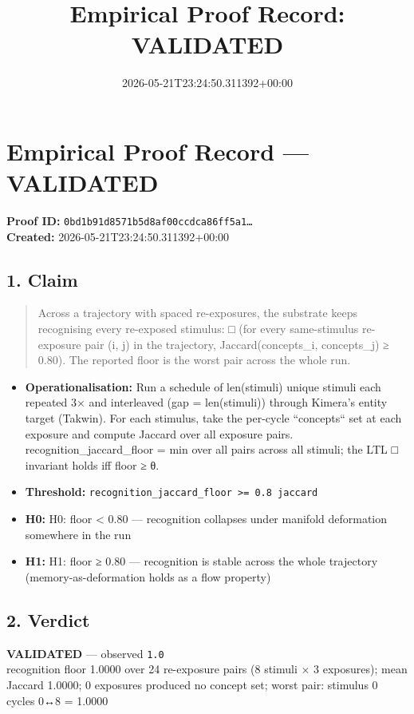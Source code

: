 \documentclass{article}
\title{Empirical Proof Record: VALIDATED}
\date{2026-05-21T23:24:50.311392+00:00}
\begin{document}
\maketitle
\section*{Empirical Proof Record --- \textcolor{validated}{\textbf{VALIDATED}}}
\textbf{Proof ID:} \texttt{0bd1b91d8571b5d8af00ccdca86ff5a1\dots}\\
\textbf{Created:} 2026-05-21T23:24:50.311392+00:00
\subsection*{1. Claim}
\begin{quote}Across a trajectory with spaced re-exposures, the substrate keeps recognising every re-exposed stimulus: □ (for every same-stimulus re-exposure pair (i, j) in the trajectory, Jaccard(concepts\_i, concepts\_j) ≥ 0.80). The reported floor is the worst pair across the whole run.\end{quote}
\begin{itemize}
\item \textbf{Operationalisation:} Run a schedule of len(stimuli) unique stimuli each repeated 3× and interleaved (gap = len(stimuli)) through Kimera's entity target (Takwin). For each stimulus, take the per-cycle ``concepts`` set at each exposure and compute Jaccard over all exposure pairs. recognition\_jaccard\_floor = min over all pairs across all stimuli; the LTL □ invariant holds iff floor ≥ θ.
\item \textbf{Threshold:} \texttt{recognition\_jaccard\_floor >= 0.8 jaccard}
\item \textbf{H0:} H0: floor < 0.80 — recognition collapses under manifold deformation somewhere in the run
\item \textbf{H1:} H1: floor ≥ 0.80 — recognition is stable across the whole trajectory (memory-as-deformation holds as a flow property)
\end{itemize}
\subsection*{2. Verdict}
\textcolor{validated}{\textbf{VALIDATED}} --- observed \texttt{1.0}\\
recognition floor 1.0000 over 24 re-exposure pairs (8 stimuli × 3 exposures); mean Jaccard 1.0000; 0 exposures produced no concept set; worst pair: stimulus 0 cycles 0↔8 = 1.0000
\end{document}
